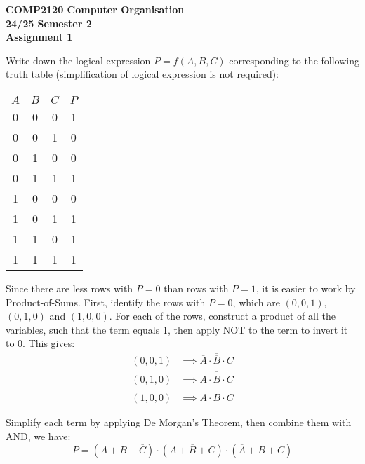 \documentclass[answers]{exam}
\begin{document}
\begin{center}
    \textbf
    {\Large{COMP2120 Computer Organisation} \\
    \large{24/25 Semester 2} \\
    \large{Assignment 1}}
\end{center}

\begin{questions}

    \question Write down the logical expression $P=f(A, B, C)$ corresponding to the following truth table
    (simplification of logical expression is not required):

    \begin{table}[H]
        \centering
        \begin{tabular}{|c|c|c||c|}
            \hline
            $A$ & $B$ & $C$ & $P$ \\
            \hline
            0 & 0 & 0 & 1 \\
            0 & 0 & 1 & 0 \\
            0 & 1 & 0 & 0 \\
            0 & 1 & 1 & 1 \\
            1 & 0 & 0 & 0 \\
            1 & 0 & 1 & 1 \\
            1 & 1 & 0 & 1 \\
            1 & 1 & 1 & 1 \\
            \hline
        \end{tabular}
    \end{table}

    \begin{solution}
        Since there are less rows with $P=0$ than rows with $P=1$, it is easier to work by Product-of-Sums.
        First, identify the rows with $P=0$, which are $(0, 0, 1)$, $(0, 1, 0)$ and $(1, 0, 0)$.
        For each of the rows, construct a product of all the variables, such that the term equals 1,
        then apply NOT to the term to invert it to 0.
        This gives:
        \begin{align*}
            (0, 0, 1) &\implies \overline{\overline{A} \cdot \overline{B} \cdot C} \\
            (0, 1, 0) &\implies \overline{\overline{A} \cdot B \cdot \overline{C}} \\
            (1, 0, 0) &\implies \overline{A \cdot \overline{B} \cdot \overline{C}}
        \end{align*}

        Simplify each term by applying De Morgan's Theorem, then combine them with AND,
        we have:
        \[
            \boxed{P = \left(A+B+\overline{C}\right)\cdot\left(A+\overline{B}+C\right)\cdot\left(\overline{A}+B+C\right)}
        \]
    \end{solution}


\end{questions}
\end{document}
